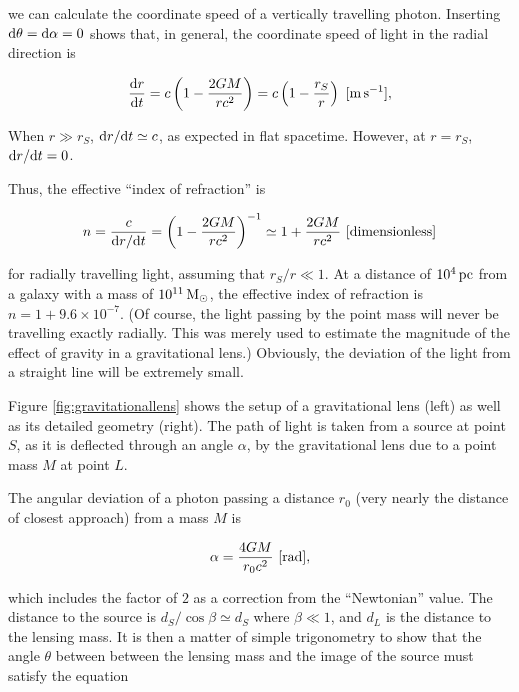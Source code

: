 \documentclass[a4paper,10pt]{article}
\begin{document}
{\noindent}we can calculate the coordinate speed of a vertically travelling photon. Inserting ${\rm d}\theta={\rm d}\alpha=0$ shows that, in general, the coordinate speed of light in the radial direction is

\begin{align*}
    \frac{{\rm d}r}{{\rm d}t} = c\left(1-\frac{2GM}{rc^2}\right) = c\left(1-\frac{r_S}{r}\right) ~ [{\rm m\,s^{-1}}],
\end{align*}

{\noindent}When $r\gg r_S$, ${\rm d}r/{\rm d}t\simeq c$, as expected in flat spacetime. However, at $r=r_S$, ${\rm d}r/{\rm d}t=0$.

{\noindent}Thus, the effective ``index of refraction'' is

\begin{align*}
    n = \frac{c}{{\rm d}r/{\rm d}t} = \left(1-\frac{2GM}{rc^2}\right)^{-1} \simeq 1+ \frac{2GM}{rc^2} ~ [{\rm dimensionless}]
\end{align*}

{\noindent}for radially travelling light, assuming that $r_S/r\ll1$. At a distance of $10^4\,{\rm pc}$ from a galaxy with a mass of $10^{11}\,{\rm M_\odot}$, the effective index of refraction is $n=1+9.6\times10^{-7}$. (Of course, the light passing by the point mass will never be travelling exactly radially. This was merely used to estimate the magnitude of the effect of gravity in a gravitational lens.) Obviously, the deviation of the light from a straight line will be extremely small. 

{\noindent}Figure \ref{fig:gravitationallens} shows the setup of a gravitational lens (left) as well as its detailed geometry (right). The path of light is taken from a source at point $S$, as it is deflected through an angle $\alpha$, by the gravitational lens due to a point mass $M$ at point $L$.

{\noindent}The angular deviation of a photon passing a distance $r_0$ (very nearly the distance of closest approach) from a mass $M$ is

\begin{align*}
    \alpha = \frac{4GM}{r_0c^2} ~ [{\rm rad}],
\end{align*}

{\noindent}which includes the factor of $2$ as a correction from the ``Newtonian'' value. The distance to the source is $d_S/\cos\beta\simeq d_S$ where $\beta\ll1$, and $d_L$ is the distance to the lensing mass. It is then a matter of simple trigonometry to show that the angle $\theta$ between between the lensing mass and the image of the source must satisfy the equation
\end{document}
